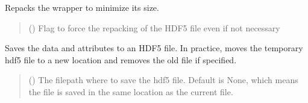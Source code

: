 \documentclass[letterpaper,10pt,english]{sphinxmanual}
\begin{document}
\begin{fulllineitems}
\begin{fulllineitems}
\begin{quote}
\begin{description}
\end{description}\end{quote}

\end{fulllineitems}


\begin{fulllineitems}
\label{\detokenize{source/_autosummary/HDF5_BLS.Wrapper:HDF5_BLS.Wrapper.repack}}
\pysigstartsignatures
\pysiglinewithargsret
{}
{}
{}
\pysigstopsignatures
\sphinxAtStartPar
Repacks the wrapper to minimize its size.
\begin{quote}\begin{description}
\sphinxAtStartPar
{} () \textendash{} Flag to force the repacking of the HDF5 file even if not necessary

\end{description}\end{quote}

\end{fulllineitems}


\begin{fulllineitems}
\label{\detokenize{source/_autosummary/HDF5_BLS.Wrapper:HDF5_BLS.Wrapper.save_as_hdf5}}
\pysigstartsignatures
\pysiglinewithargsret
{}
{\sphinxparamcomma {}\sphinxparamcomma {}}
{}
\pysigstopsignatures
\sphinxAtStartPar
Saves the data and attributes to an HDF5 file. In practice, moves the temporary hdf5 file to a new location and removes the old file if specified.
\begin{quote}\begin{description}
\sphinxAtStartPar
{} (\sphinxstyleliteralemphasis{\sphinxupquote{, }}) \textendash{} The filepath where to save the hdf5 file. Default is None, which means the file is saved in the same location as the current file.


\end{description}
\end{quote}
\end{fulllineitems}
\end{fulllineitems}
\end{document}
